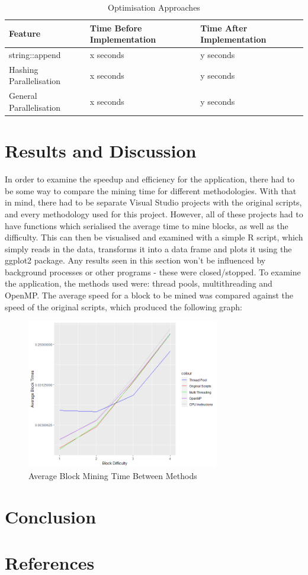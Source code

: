 \documentclass[12pt, a4paper]{article}
\begin{document}
\begin{table}[H]
    \centering
    \begin{tabular}{| l | l | l |}
    \hline
    Feature & Time Before Implementation & Time After Implementation \\ \hline
    string::append & x seconds & y seconds \\ \hline
    Hashing Parallelisation & x seconds & y seconds \\ \hline
    General Parallelisation & x seconds & y seconds \\ \hline
    \end{tabular}
    \caption{Optimisation Approaches}
\end{table}

\section{Results and Discussion}
In order to examine the speedup and efficiency for the application, there had to be some way to compare the mining time for different methodologies. With that in mind, there had to be separate Visual Studio projects with the original scripts, and every methodology used for this project. However, all of these projects had to have functions which serialised the average time to mine blocks, as well as the difficulty. This can then be visualised and examined with a simple R script, which simply reads in the data, transforms it into a data frame and plots it using the ggplot2 package. Any results seen in this section won't be influenced by background processes or other programs - these were closed/stopped. To examine the application, the methods used were: thread pools, multithreading and OpenMP. The average speed for a block to be mined was compared against the speed of the original scripts, which produced the following graph: \\

\begin{figure}[H]
	\centering
		\includegraphics[width=0.75\textwidth]{"Placeholder"}
		\caption{Average Block Mining Time Between Methods}
\end{figure}



\section{Conclusion}

\section{References}
\end{document}
